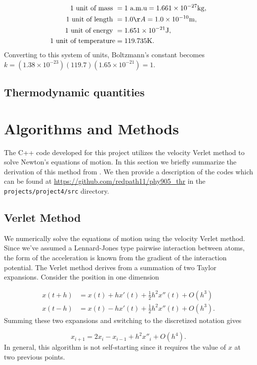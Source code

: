 \documentclass[10pt,showpacs,preprintnumbers,footinbib,amsmath,amssymb,aps,prl,twocolumn,groupedaddress,superscriptaddress,showkeys]{revtex4-1}
\newcommand{\pwrten}[1]{%
	\ensuremath{10^{#1}} }
\begin{document}
\begin{align*}
	\text{1 unit of mass } &= 1 \text{ a.m.u} = 1.661\times 10^{-27}\mathrm{kg},\\
	\text{1 unit of length } &= 1.0 {\AA} = 1.0\times 10^{-10}\mathrm{m},\\
	\text{1 unit of energy } &= 1.651\times 10^{-21}\mathrm{J},\\
	\text{1 unit of temperature} &= 119.735\mathrm{K}.
\end{align*}
Converting to this system of units, Boltzmann's constant becomes
$k = (1.38 \times \pwrten{-23} )(119.7)(1.65 \times \pwrten{-21}) = 1$.

\subsection*{Thermodynamic quantities}

\section*{Algorithms and Methods}

The C++ code developed for this project utilizes the velocity
Verlet method to solve Newton's equations of motion. In this section we briefly
summarize the derivation of this method from \citet{Morten}. We
then provide a description of the codes which can be
found at \url{https://github.com/redpath11/phy905_thr} in the
\texttt{projects/project4/src} directory.

\subsection*{Verlet Method}

We numerically solve the equations of motion using the velocity
Verlet method. Since we've assumed a Lennard-Jones type
pairwise interaction between atoms, the form of the acceleration
is known from the gradient of the interaction potential. The Verlet
method derives from a summation of two Taylor expansions. Consider
the position in one dimension

\begin{align*}
	x(t+h) &= x(t) + h x'(t) + \frac{1}{2} h^2  x''(t) + O(h^3)\\
	x(t-h) &= x(t)  - h x'(t) + \frac{1}{2} h^2  x''(t) + O(h^3).
\end{align*}
Summing these two expansions and switching to the discretized
notation gives

\begin{equation*}
	x_{i+1} = 2 x_i - x_{i-1} + h^2 x''_i + O(h^4).
\end{equation*}
In general, this algorithm is not self-starting since it requires the
value of $x$ at two previous points.
\end{document}
